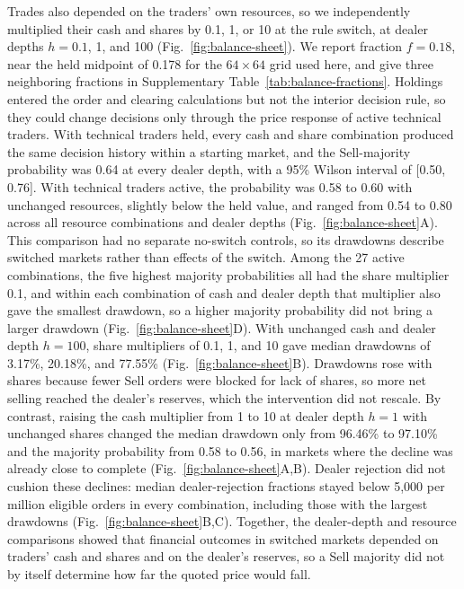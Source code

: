 Trades also depended on the traders' own resources, so we independently
multiplied their cash and shares by 0.1, 1, or 10 at the rule switch,
at dealer depths $h=0.1$, 1, and 100 (Fig.~\ref{fig:balance-sheet}). We
report fraction $f=0.18$, near the held midpoint of 0.178 for the
$64\times64$ grid used here, and give three neighboring fractions in Supplementary
Table~\ref{tab:balance-fractions}. Holdings entered the order and
clearing calculations but not the interior decision rule, so they could
change decisions only through the price response of active technical
traders. With technical traders held, every cash and share combination
produced the same decision history within a starting market, and the
Sell-majority probability was 0.64 at every dealer depth, with a 95\%
Wilson interval of [0.50, 0.76]. With technical traders active, the
probability was 0.58 to 0.60 with unchanged resources, slightly below
the held value, and ranged from 0.54 to 0.80 across all resource
combinations and dealer depths (Fig.~\ref{fig:balance-sheet}A). This comparison had no separate
no-switch controls, so its drawdowns describe switched markets rather
than effects of the switch. Among the 27 active combinations, the five
highest majority probabilities all had the share multiplier 0.1, and
within each combination of cash and dealer depth that multiplier also
gave the smallest drawdown, so a higher majority probability did not
bring a larger drawdown (Fig.~\ref{fig:balance-sheet}D). With unchanged cash
and dealer depth $h=100$, share multipliers of 0.1, 1, and 10 gave
median drawdowns of 3.17\%, 20.18\%, and 77.55\%
(Fig.~\ref{fig:balance-sheet}B). Drawdowns rose with shares because
fewer Sell orders were blocked for lack of shares, so more net selling
reached the dealer's reserves, which the intervention did not rescale. By contrast, raising the cash
multiplier from 1 to 10 at dealer depth $h=1$ with unchanged shares
changed the median drawdown only from 96.46\% to 97.10\% and the
majority probability from 0.58 to 0.56, in markets where the decline was
already close to complete (Fig.~\ref{fig:balance-sheet}A,B). Dealer
rejection did not cushion these declines: median dealer-rejection
fractions stayed below 5,000 per million eligible orders in every
combination, including those with the largest drawdowns
(Fig.~\ref{fig:balance-sheet}B,C). Together, the dealer-depth and
resource comparisons showed that financial outcomes in switched markets
depended on traders' cash and shares and on the dealer's reserves, so a
Sell majority did not by itself determine how far the quoted price
would fall.

